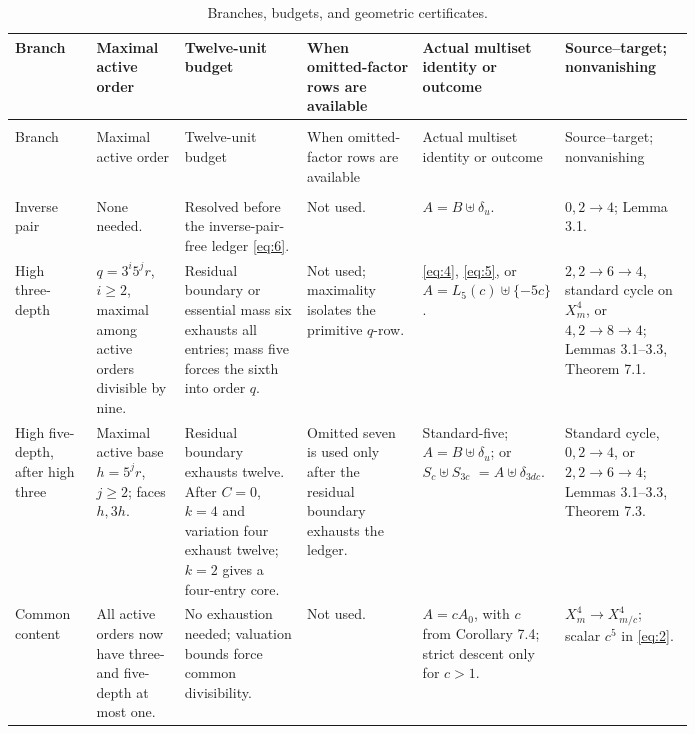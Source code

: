 \documentclass[11pt]{amsart}
\numberwithin{theorem}{section}
\theoremstyle{remark}
\numberwithin{equation}{section}
\begin{document}
\begin{landscape}
\begingroup
\footnotesize
\setlength{\tabcolsep}{3pt}
\renewcommand{\arraystretch}{1.12}
\begin{longtable}{@{}>{\raggedright\arraybackslash}p{0.12\linewidth}>{\raggedright\arraybackslash}p{0.13\linewidth}>{\raggedright\arraybackslash}p{0.18\linewidth}>{\raggedright\arraybackslash}p{0.17\linewidth}>{\raggedright\arraybackslash}p{0.19\linewidth}>{\raggedright\arraybackslash}p{}@{}}
\caption{Branches, budgets, and geometric certificates.}\label{tab:assembly}\\
\toprule
Branch & Maximal active order & Twelve-unit budget & When omitted-factor rows are available & Actual multiset identity or outcome & Source--target; nonvanishing \\
\midrule
\endfirsthead
\multicolumn{6}{l}{\textit{Table \thetable\ continued.}}\\
\toprule
Branch & Maximal active order & Twelve-unit budget & When omitted-factor rows are available & Actual multiset identity or outcome & Source--target; nonvanishing \\
\midrule
\endhead
\midrule
\multicolumn{6}{r}{\textit{Continued on the next page.}}\\
\endfoot
\bottomrule
\endlastfoot
Inverse pair & None needed. & Resolved before the inverse-pair-free ledger \eqref{eq:6}. & Not used. & \(A=B\uplus\delta_u\). & \(0,2\to4\); Lemma 3.1.\\
\addlinespace
High three-depth & \(q=3^i5^jr\), \(i\ge2\), maximal among active orders divisible by nine. & Residual boundary or essential mass six exhausts all entries; mass five forces the sixth into order \(q\). & Not used; maximality isolates the primitive \(q\)-row. & \eqref{eq:4}, \eqref{eq:5}, or \(A=L_5(c)\uplus\{-5c\}\). & \(2,2\to6\to4\), standard cycle on \(X_m^4\), or \(4,2\to8\to4\); Lemmas 3.1--3.3, Theorem 7.1.\\
\addlinespace
High five-depth, after high three & Maximal active base \(h=5^jr\), \(j\ge2\); faces \(h,3h\). & Residual boundary exhausts twelve. After \(C=0\), \(k=4\) and variation four exhaust twelve; \(k=2\) gives a four-entry core. & Omitted seven is used only after the residual boundary exhausts the ledger. & Standard-five; \(A=B\uplus\delta_u\); or \(S_c\uplus S_{3c}\) \(=A\uplus\delta_{3dc}\). & Standard cycle, \(0,2\to4\), or \(2,2\to6\to4\); Lemmas 3.1--3.3, Theorem 7.3.\\
\addlinespace
Common content & All active orders now have three- and five-depth at most one. & No exhaustion needed; valuation bounds force common divisibility. & Not used. & \(A=cA_0\), with \(c\) from Corollary 7.4; strict descent only for \(c>1\). & \(X_m^4\to X_{m/c}^4\); scalar \(c^5\) in \eqref{eq:2}.\\

\end{longtable}
\end{landscape}
\end{document}
